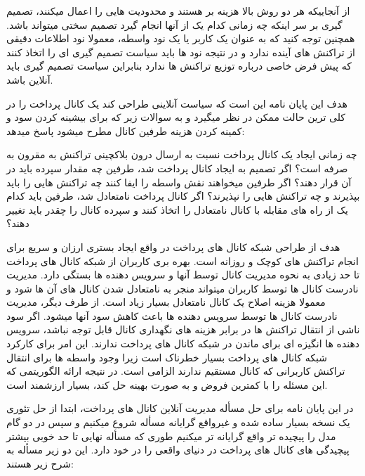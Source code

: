  از آنجاییکه هر دو روش بالا هزینه بر هستند و محدودیت هایی را اعمال میکنند، تصمیم گیری بر سر اینکه چه زمانی کدام یک از آنها انجام گیرد تصمیم سختی میتواند باشد. همچنین توجه کنید که به عنوان یک کاربر یا یک نود واسطه، معمولا نود اطلاعات دقیقی از تراکنش های آینده ندارد و در نتیجه نود ها باید سیاست تصمیم گیری ای را اتخاذ کنند که پیش فرض خاصی درباره توزیع تراکنش ها ندارد بنابراین سیاست تصمیم گیری باید آنلاین باشد. 
 
 
هدف این پایان نامه این است که سیاست آنلاینی طراحی کند یک کانال پرداخت را در کلی ترین حالت ممکن در نظر 
میگیرد و به سوالات زیر که برای بیشینه کردن سود و کمینه کردن هزینه طرفین کانال مطرح میشود پاسخ میدهد:


چه زمانی ایجاد یک کانال پرداخت نسبت به ارسال درون بلاکچینی تراکنش به مقرون به صرفه است؟
اگر تصمیم به ایجاد کانال پرداخت شد، طرفین چه مقدار سپرده باید در آن قرار دهند؟
اگر طرفین میخواهند نقش واسطه را ایفا کنند چه تراکنش هایی را باید بپذیرند و چه تراکنش هایی را نپذیرند؟
اگر کانال پرداخت نامتعادل شد، طرفین باید کدام یک از راه های  مقابله با کانال نامتعادل را اتخاذ کنند و سپرده کانال را چقدر باید تغییر دهند؟




هدف از طراحی شبکه کانال های پرداخت در واقع ایجاد بستری ارزان و سریع برای انجام تراکنش های کوچک و روزانه  است. بهره بری کاربران از شبکه کانال های پرداخت تا حد زیادی به نحوه مدیریت کانال توسط آنها و سرویس دهنده ها بستگی دارد. مدیریت نادرست کانال ها توسط کاربران میتواند منجر به نامتعادل شدن کانال های آن ها شود و معمولا هزینه اصلاح یک کانال نامتعادل بسیار زیاد است. از طرف دیگر، مدیریت نادرست کانال ها توسط سرویس دهنده ها باعث کاهش سود آنها میشود. اگر سود ناشی از انتقال تراکنش ها در برابر هزینه های نگهداری کانال قابل توجه نباشد، سرویس دهنده ها انگیزه ای برای ماندن در شبکه کانال های پرداخت ندارند. این امر برای کارکرد شبکه کانال های پرداخت بسیار خطرناک است زیرا وجود واسطه ها برای انتقال تراکنش کاربرانی که کانال مستقیم ندارند الزامی است. در نتیجه ارائه الگوریتمی که این مسئله را با کمترین فروض و به صورت بهینه حل کند، بسیار ارزشمند است. 


در این پایان نامه برای حل مسأله مدیریت آنلاین کانال های پرداخت، ابتدا از حل تئوری یک نسخه بسیار ساده شده و غیرواقع گرایانه مسأله شروع میکنیم و سپس در دو گام مدل را پیچیده تر واقع گرایانه تر میکنیم طوری که مسأله نهایی تا حد خوبی بیشتر پیچیدگی های کانال های پرداخت در دنیای واقعی را در خود دارد. این دو زیر مسأله به شرح زیر هستند:

